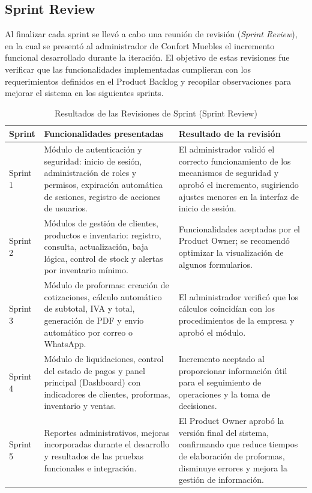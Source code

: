 \subsection{Sprint Review}

Al finalizar cada sprint se llevó a cabo una reunión de revisión (\textit{Sprint Review}), en la cual se presentó al administrador de Confort Muebles el incremento funcional desarrollado durante la iteración. El objetivo de estas revisiones fue verificar que las funcionalidades implementadas cumplieran con los requerimientos definidos en el Product Backlog y recopilar observaciones para mejorar el sistema en los siguientes sprints.
\begin{table}[H]
\centering
\caption{Resultados de las Revisiones de Sprint (Sprint Review)}
\label{tab:sprint_review}
\begin{tabular}{@{}p{1.5cm}p{5cm}p{6.5cm}@{}}
\toprule
\textbf{Sprint} & \textbf{Funcionalidades presentadas} & \textbf{Resultado de la revisión} \\
\midrule
Sprint 1 & Módulo de autenticación y seguridad: inicio de sesión, administración de roles y permisos, expiración automática de sesiones, registro de acciones de usuarios. & 
El administrador validó el correcto funcionamiento de los mecanismos de seguridad y aprobó el incremento, sugiriendo ajustes menores en la interfaz de inicio de sesión. \\
\midrule
Sprint 2 & Módulos de gestión de clientes, productos e inventario: registro, consulta, actualización, baja lógica, control de stock y alertas por inventario mínimo. & 
Funcionalidades aceptadas por el Product Owner; se recomendó optimizar la visualización de algunos formularios. \\
\midrule
Sprint 3 & Módulo de proformas: creación de cotizaciones, cálculo automático de subtotal, IVA y total, generación de PDF y envío automático por correo o WhatsApp. & 
El administrador verificó que los cálculos coincidían con los procedimientos de la empresa y aprobó el módulo. \\
\midrule
Sprint 4 & Módulo de liquidaciones, control del estado de pagos y panel principal (Dashboard) con indicadores de clientes, proformas, inventario y ventas. & 
Incremento aceptado al proporcionar información útil para el seguimiento de operaciones y la toma de decisiones. \\
\midrule
Sprint 5 & Reportes administrativos, mejoras incorporadas durante el desarrollo y resultados de las pruebas funcionales e integración. & 
El Product Owner aprobó la versión final del sistema, confirmando que reduce tiempos de elaboración de proformas, disminuye errores y mejora la gestión de información. \\
\bottomrule
\end{tabular}
\end{table}





